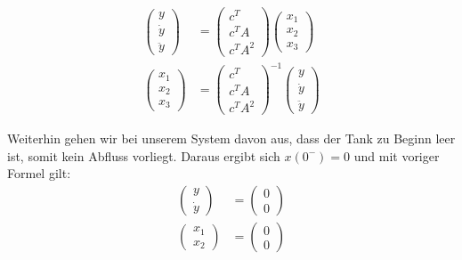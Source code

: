 \begin{align*}
    \left(\begin{array}{c} y \\ \dot y \\ \ddot y \end{array}\right) &= \left(\begin{array}{l} c^T \\ c^T A \\ c^T A^2 \end{array}\right) \left(\begin{array}{c} x_1 \\ x_2 \\ x_3 \end{array}\right) \\
    \left(\begin{array}{c} x_1 \\ x_2 \\ x_3 \end{array}\right) &= \left(\begin{array}{l} c^T \\ c^T A \\ c^T A^2 \end{array}\right)^{-1} \left(\begin{array}{c} y \\ \dot y \\ \ddot y \end{array}\right)
\end{align*}

Weiterhin gehen wir bei unserem System davon aus, dass der Tank zu Beginn leer ist, somit kein Abfluss vorliegt. Daraus ergibt sich $x(0^-) = 0$ und mit voriger Formel gilt:
\begin{align*}
    \left(\begin{array}{c} y \\ \dot y \end{array}\right) &= \left(\begin{array}{c}0\\0\end{array}\right) \\
    \left(\begin{array}{c} x_1 \\ x_2 \end{array}\right) &= \left(\begin{array}{c}0\\0\end{array}\right)
\end{align*}


